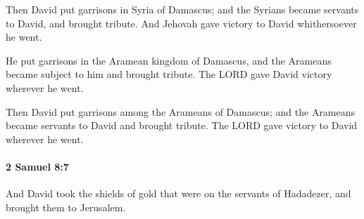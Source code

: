 			\begin{versebox}
					\item[BHS] 
					\item[ASV] Then David put garrisons in Syria of Damascus; and the Syrians became servants to David, and brought tribute. And Jehovah gave victory to David whithersoever he went.
					\item[NIV] He put garrisons in the Aramean kingdom of Damascus, and the Arameans became subject to him and brought tribute. The LORD gave David victory wherever he went.
					\item[NRSV] Then David put garrisons among the Arameans of Damascus; and the Arameans became servants to David and brought tribute. The LORD gave victory to David wherever he went.
			\end{versebox}

		\paragraph{2 Samuel 8:7} %
			\label{2SAMUEL-8-7}

			And David took the shields of gold that were on the servants of Hadadezer, and brought them to Jerusalem.

